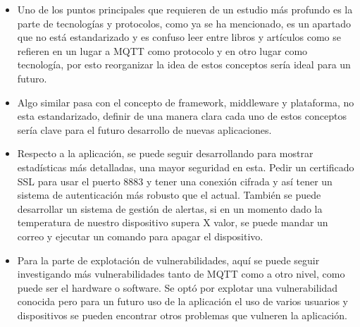 \begin{itemize}
    \item Uno de los puntos principales que requieren de un estudio más profundo es la parte de tecnologías y protocolos, como ya se ha mencionado, es un apartado que no está estandarizado y es confuso leer entre libros y artículos como se refieren en un lugar a MQTT como protocolo y en otro lugar como tecnología, por esto reorganizar la idea de estos conceptos sería ideal para un futuro.
    \item Algo similar pasa con el concepto de framework, middleware y plataforma, no esta estandarizado, definir de una manera clara cada uno de estos conceptos sería clave para el futuro desarrollo de nuevas aplicaciones.
    \item Respecto a la aplicación, se puede seguir desarrollando para mostrar estadísticas más detalladas, una mayor seguridad en esta. Pedir un certificado SSL para usar el puerto 8883 y tener una conexión cifrada y así tener un sistema de autenticación más robusto que el actual. También se puede desarrollar un sistema de gestión de alertas, si en un momento dado la temperatura de nuestro dispositivo supera X valor, se puede mandar un correo y ejecutar un comando para apagar el dispositivo.
    \item Para la parte de explotación de vulnerabilidades, aquí se puede seguir investigando más vulnerabilidades tanto de MQTT como a otro nivel, como puede ser el hardware o software. Se optó por explotar una vulnerabilidad conocida pero para un futuro uso de la aplicación el uso de varios usuarios y dispositivos se pueden encontrar otros problemas que vulneren la aplicación.
\end{itemize}